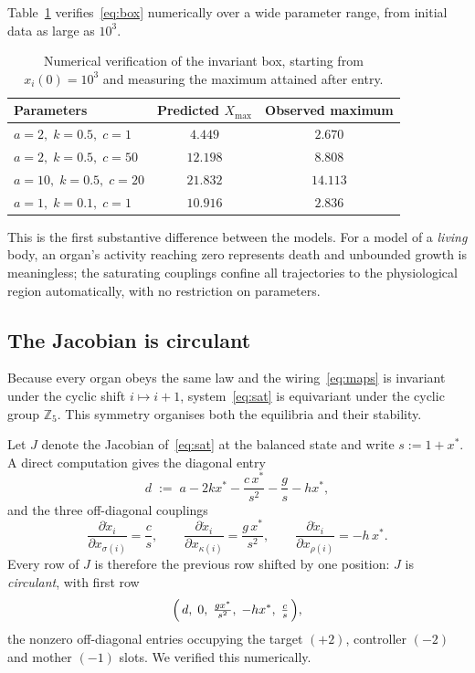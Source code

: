 \documentclass[11pt]{article}
\newcommand{\Z}{{\mathbb{Z}}}
\begin{document}
Table~\ref{tab:box} verifies~\eqref{eq:box} numerically over a wide parameter
range, from initial data as large as $10^3$.

\begin{table}[!htb]
\centering
\begin{tabular}{lcc}
\toprule
Parameters & Predicted $X_{\max}$ & Observed maximum \\
\midrule
$a{=}2,\;k{=}0.5,\;c{=}1$   & $4.449$  & $2.670$ \\
$a{=}2,\;k{=}0.5,\;c{=}50$  & $12.198$ & $8.808$ \\
$a{=}10,\;k{=}0.5,\;c{=}20$ & $21.832$ & $14.113$ \\
$a{=}1,\;k{=}0.1,\;c{=}1$   & $10.916$ & $2.836$ \\
\bottomrule
\end{tabular}
\caption{Numerical verification of the invariant box, starting from
$x_i(0)=10^3$ and measuring the maximum attained after entry.}
\label{tab:box}
\end{table}

This is the first substantive difference between the models. For a model of a
\emph{living} body, an organ's activity reaching zero represents death and
unbounded growth is meaningless; the saturating couplings confine all
trajectories to the physiological region automatically, with no restriction on
parameters.

\subsection{The Jacobian is circulant}

Because every organ obeys the same law and the wiring~\eqref{eq:maps} is
invariant under the cyclic shift $i\mapsto i+1$, system~\eqref{eq:sat} is
equivariant under the cyclic group $\Z_5$. This symmetry organises both the
equilibria and their stability.

Let $J$ denote the Jacobian of~\eqref{eq:sat} at the balanced state and write
$s:=1+x^\ast$. A direct computation gives the diagonal entry
\[
d \;:=\; a - 2k x^\ast - \frac{c\,x^\ast}{s^2} - \frac{g}{s} - h x^\ast ,
\]
and the three off-diagonal couplings
\[
\frac{\partial \dot{x}_i}{\partial x_{\sigma(i)}} = \frac{c}{s},
\qquad
\frac{\partial \dot{x}_i}{\partial x_{\kappa(i)}} = \frac{g\,x^\ast}{s^2},
\qquad
\frac{\partial \dot{x}_i}{\partial x_{\rho(i)}} = -h\,x^\ast .
\]
Every row of $J$ is therefore the previous row shifted by one position: $J$ is
\emph{circulant}, with first row
\[
\Bigl(\,d,\;0,\;\tfrac{g x^\ast}{s^2},\;-h x^\ast,\;\tfrac{c}{s}\,\Bigr),
\]
the nonzero off-diagonal entries occupying the target $(+2)$, controller $(-2)$
and mother $(-1)$ slots. We verified this numerically.
\end{document}
